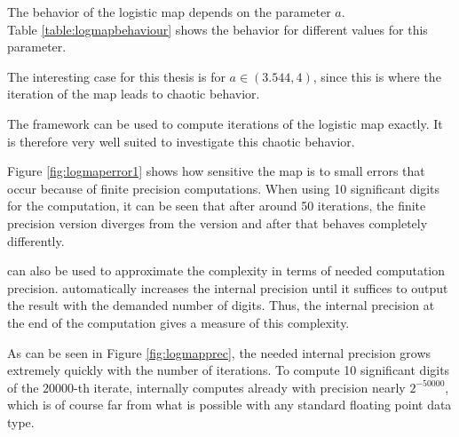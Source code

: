   The behavior of the logistic map depends on the parameter $a$.\\
  Table \ref{table:logmapbehaviour} shows the behavior for different values for this parameter.

  The interesting case for this thesis is for $a \in (3.544, 4)$, since this is  where the iteration of the map leads to chaotic behavior.

  The \irram framework can be used to compute iterations of the logistic map
  exactly.
  It is therefore very well suited to investigate this chaotic behavior.
  
  Figure \ref{fig:logmaperror1} shows how sensitive the map is to small errors
  that occur because of finite precision computations.
  When using 10 significant digits for the computation, it can be seen that
  after around 50 iterations, the finite precision version diverges from the
  \irram version and after that behaves completely differently. 

  \irram can also be used to approximate the complexity in terms of needed computation precision. 
  \irram automatically increases the internal precision until it suffices to output the result with the demanded number of digits.
  Thus, the internal precision at the end of the computation gives a measure of this complexity. 

  As can be seen in Figure \ref{fig:logmapprec}, the needed internal precision
  grows extremely quickly with the number of iterations.  
  To compute 10 significant digits of the $20000$-th iterate, \irram internally
  computes already with precision nearly $2^{-50000}$, which is of course far
  from what is possible with any standard floating point data type.   
